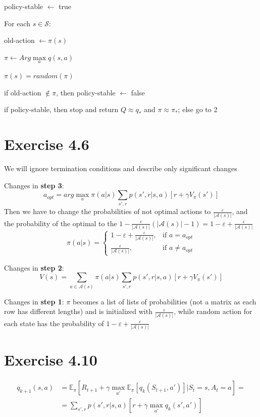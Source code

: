 \documentclass[12pt]{article}
\begin{document}
        \qquad policy-stable $\leftarrow$ true

        \qquad For each $s \in \mathcal{S}$:

        \qquad \qquad old-action $\leftarrow \pi(s)$

        \qquad \qquad $\pi \leftarrow Arg\max\limits_a q(s,a)$

        \qquad \qquad $\pi(s) = random(\pi)$

        \qquad \qquad if old-action $\notin \pi$, then policy-stable $\leftarrow$ false

        \qquad if policy-stable, then stop and return $Q \approx q_*$
        and $\pi \approx \pi_*$; else go to 2

    \section{Exercise 4.6}
        We will ignore termination conditions and describe only significant changes

        Changes in \textbf{step 3}:
            $$a_{opt} = arg\max\limits_a \pi(a|s)\sum\limits_{s',r} p(s',r|s,a)
            [r + \gamma V_\pi(s')]$$
            Then we have to change the probabilities of not optimal actions to
            $\frac{\varepsilon}{|\mathcal{A}(s)|}$, and the probability of the optimal
            to the $1 - \frac{\varepsilon}{|\mathcal{A}(s)|}(|\mathcal{A}(s)| -1) =
            1 - \varepsilon + \frac{\varepsilon}{|\mathcal{A}(s)|}$
            \[
                \pi(a|s) =
                \begin{cases}
                    1 - \varepsilon + \frac{\varepsilon}{|\mathcal{A}(s)|}, & \text{if } a = a_{opt} \\
                    \frac{\varepsilon}{|\mathcal{A}(s)|}, & \text{if } a \neq a_{opt}
                \end{cases}
            \]

        Changes in \textbf{step 2}:
            $$V(s) = \sum\limits_{a \in \mathcal{A}(s)} \pi(a|s)\sum\limits_{s',r} p(s',r|s,a)
            [r + \gamma V_\pi(s')]$$

        Changes in \textbf{step 1}: $\pi$ becomes a list of lists of probabilities
        (not a matrix as each row has different lengths) and is initialized with
        $\frac{\varepsilon}{|\mathcal{A}(s)|}$, while random action for each
        state has the probability of $1 - \varepsilon + \frac{\varepsilon}{|\mathcal{A}(s)|}$

    \section{Exercise 4.10}
        \begin{align*}
            q_{k+1}(s,a) &= \mathbb{E}_\pi[R_{t+1} +
            \gamma \max\limits_{a'} \mathbb{E}_\pi[q_k(S_{t+1},a')]
            |S_t=s,A_t=a] =\\
            &= \sum\limits_{s',r} p(s',r|s,a)[r +
            \gamma \max\limits_{a'} q_k(s',a')]
        \end{align*}
\end{document}
